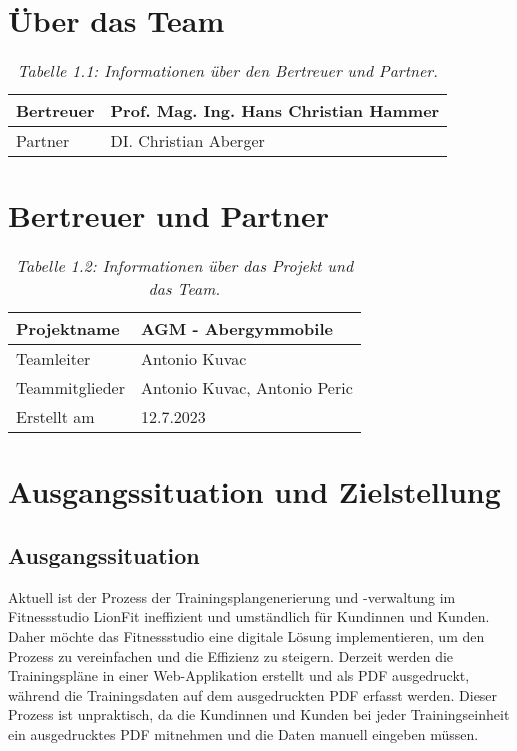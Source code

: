 \section{Über das Team}
\begin{table}[h]
    \centering
    \caption{\textit{Tabelle 1.1: Informationen über den Bertreuer und Partner.}}
    \begin{tabular}{|p{}|p{}|}
        \hline
        Bertreuer & Prof. Mag. Ing. Hans Christian Hammer \\ \hline
        Partner & DI. Christian Aberger \\ \hline
    \end{tabular}
\end{table}

\section{Bertreuer und Partner}
\begin{table}[h]
    \centering
    \caption{\textit{Tabelle 1.2: Informationen über das Projekt und das Team.}}
    \begin{tabular}{|p{}|p{}|}
        \hline
        Projektname & AGM - Abergymmobile \\ \hline
        Teamleiter & Antonio Kuvac \\ \hline
        Teammitglieder & Antonio Kuvac, Antonio Peric \\ \hline
        Erstellt am & 12.7.2023 \\ \hline
    \end{tabular}
\end{table}

\section{Ausgangssituation und Zielstellung}

\subsection{Ausgangssituation}
Aktuell ist der Prozess der Trainingsplangenerierung und -verwaltung im Fitnessstudio LionFit ineffizient und umständlich für Kundinnen und Kunden. Daher möchte das Fitnessstudio eine digitale Lösung implementieren, um den Prozess zu vereinfachen und die Effizienz zu steigern. Derzeit werden die Trainingspläne in einer Web-Applikation erstellt und als PDF ausgedruckt, während die Trainingsdaten auf dem ausgedruckten PDF erfasst werden. Dieser Prozess ist unpraktisch, da die Kundinnen und Kunden bei jeder Trainingseinheit ein ausgedrucktes PDF mitnehmen und die Daten manuell eingeben müssen.

